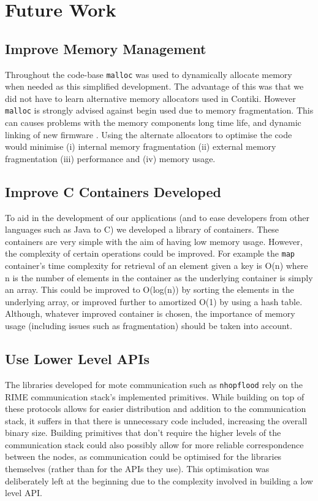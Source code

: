 \section{Future Work}

\subsection{Improve Memory Management}

Throughout the code-base \verb|malloc| was used to dynamically allocate memory when needed as this simplified development. The advantage of this was that we did not have to learn alternative memory allocators used in Contiki. However \verb|malloc| is strongly advised against begin used due to memory fragmentation. This can causes problems with the memory components long time life, and dynamic linking of new firmware \cite{Dai:2004:EEL:1031495.1031516,Dunkels:2006:RDL:1182807.1182810}. Using the alternate allocators to optimise the code would minimise (i) internal memory fragmentation (ii) external memory fragmentation (iii) performance and (iv) memory usage.

\subsection{Improve C Containers Developed}

To aid in the development of our applications (and to ease developers from other languages such as Java to C) we developed a library of containers. These containers are very simple with the aim of having low memory usage. However, the complexity of certain operations could be improved. For example the \verb|map| container's time complexity for retrieval of an element given a key is O(n) where n is the number of elements in the container as the underlying container is simply an array. This could be improved to O(log(n)) by sorting the elements in the underlying array, or improved further to amortized O(1) by using a hash table. Although, whatever improved container is chosen, the importance of memory usage (including issues such as fragmentation) should be taken into account.

\subsection{Use Lower Level APIs}

The libraries developed for mote communication such as \verb|nhopflood| rely on the RIME communication stack's implemented primitives. While building on top of these protocols allows for easier distribution and addition to the communication stack, it suffers in that there is unnecessary code included, increasing the overall binary size. Building primitives that don't require the higher levels of the communication stack could also possibly allow for more reliable correspondence between the nodes, as communication could be optimised for the libraries themselves (rather than for the APIs they use). This optimisation was deliberately left at the beginning due to the complexity involved in building a low level API.

